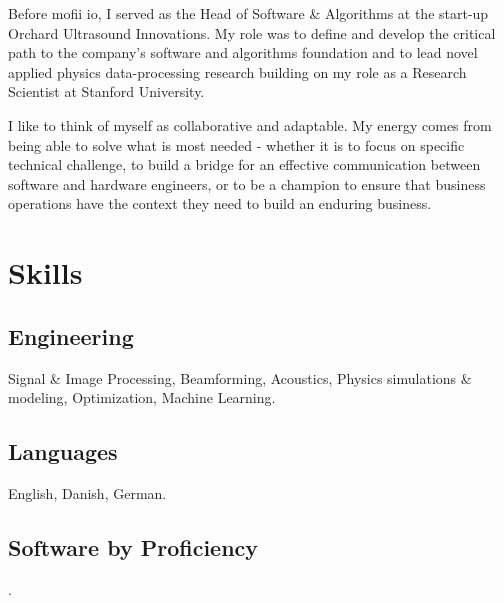 \documentclass[8pt]{mofiicv}
\begin{document}
\begin{minipage}[T]{\FirstColumnWidth}
Before mofii io, I served as the Head of Software \& Algorithms at the start-up Orchard Ultrasound Innovations. My role was to define and develop the critical path to the company's software and algorithms foundation and to lead novel applied physics data-processing research building on my role as a Research Scientist at Stanford University.

I like to think of myself as collaborative and adaptable. My energy comes from being able to solve what is most needed - whether it is to focus on specific technical challenge, to build a bridge for an effective communication between software and hardware engineers, or to be a champion to ensure that business operations have the context they need to build an enduring business. 

\vspace{2em}
\section{Skills}
\subsection{Engineering} Signal \& Image Processing, Beamforming, Acoustics, Physics simulations \& modeling, Optimization, Machine Learning.
\subsection{Languages} English, Danish, German.

\subsection{Software by Proficiency}
\textcolor{sand2}{.}
\null\vspace*{1\baselineskip}
\begin{barchart}{4} 
\end{barchart}
\end{minipage}
\hspace*{\ColSep}
\end{document}
